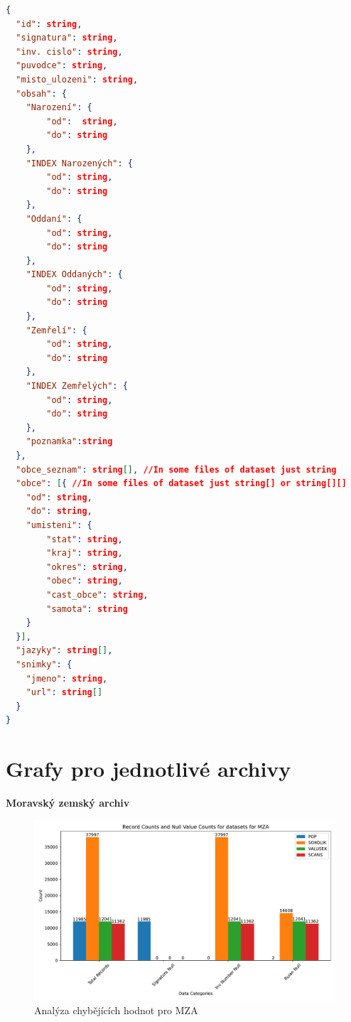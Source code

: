 \newpage
\begin{lstlisting}[language=json, caption=Formát datové sady se skeny]
{
  "id": string,
  "signatura": string,
  "inv. cislo": string,
  "puvodce": string,
  "misto_ulozeni": string,
  "obsah": {
    "Narození": {
        "od":  string,
        "do": string
    },
    "INDEX Narozených": {
        "od": string,
        "do": string
    },
    "Oddaní": {
        "od": string,
        "do": string
    },
    "INDEX Oddaných": {
        "od": string,
        "do": string
    },
    "Zemřelí": {
        "od": string,
        "do": string
    },
    "INDEX Zemřelých": {
        "od": string,
        "do": string
    },
    "poznamka":string
  },
  "obce_seznam": string[], //In some files of dataset just string
  "obce": [{ //In some files of dataset just string[] or string[][]
    "od": string,
    "do": string,
    "umisteni": {
        "stat": string,
        "kraj": string,
        "okres": string,
        "obec": string,
        "cast_obce": string,
        "samota": string
    }
  }],
  "jazyky": string[],
  "snimky": {
    "jmeno": string,
    "url": string[]
  }
}
\end{lstlisting}



\section{Grafy pro jednotlivé archivy}

\noindent\textbf{Moravský zemský archiv}\\
\begin{figure}[htbp]
\centering
    \includegraphics[scale=.5]{obrazky-figures/dataAnalysis/mza/missingValues.pdf}
    \caption{Analýza chybějících hodnot pro MZA}
\end{figure}

